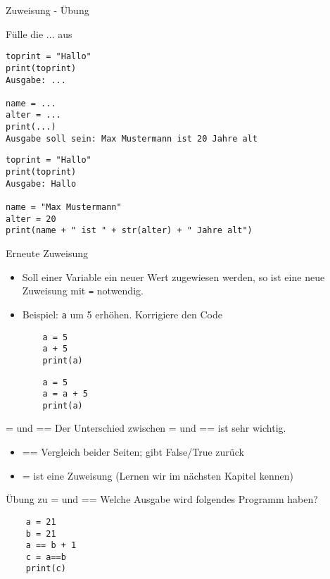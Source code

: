 \begin{frame}[fragile]{Zuweisung - Übung}

Fülle die ... aus
\begin{lstlisting}
toprint = "Hallo"
print(toprint)
Ausgabe: ...

name = ...
alter = ...
print(...)
Ausgabe soll sein: Max Mustermann ist 20 Jahre alt
\end{lstlisting}

\pause{}

\begin{lstlisting}
toprint = "Hallo"
print(toprint)
Ausgabe: Hallo

name = "Max Mustermann"
alter = 20
print(name + " ist " + str(alter) + " Jahre alt")
\end{lstlisting}

\end{frame}



\begin{frame}[fragile]{Erneute Zuweisung}
\begin{itemize}
	\item Soll einer Variable ein neuer Wert zugewiesen werden, so ist eine neue Zuweisung mit  \texttt{=} notwendig.
	\item Beispiel: \texttt{a} um 5 erhöhen. Korrigiere den Code
	\begin{lstlisting}
	a = 5
	a + 5
	print(a)
	\end{lstlisting}
	\pause{}
	\begin{lstlisting}
	a = 5
	a = a + 5
	print(a)
	\end{lstlisting}
	
\end{itemize}
\end{frame}






\begin{frame}[fragile]{= und == }
Der Unterschied zwischen = und == ist sehr wichtig.
\begin{itemize}
\item == Vergleich beider Seiten; gibt False/True zurück
\item = ist eine Zuweisung (Lernen wir im nächsten Kapitel kennen)
\end{itemize}
\end{frame}

\begin{frame}[fragile]{Übung zu = und == }
Welche Ausgabe wird folgendes Programm haben?
	\begin{lstlisting}
	a = 21
	b = 21
	a == b + 1
	c = a==b
	print(c)
	\end{lstlisting}
\end{frame}


